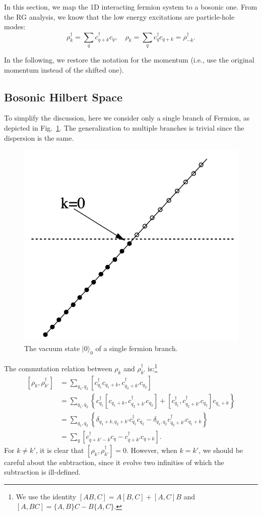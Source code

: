 In this section, we map the 1D interacting fermion system to a bosonic one.
From the RG analysis, we know that the low energy excitations are particle-hole modes:
\begin{equation}
	\rho_{k}^\dagger = \sum_{q} c_{q+k}^\dagger c_{q}, \quad
	\rho_{k} = \sum_{q} c_{q}^\dagger c_{q+k} = \rho_{-k}^\dagger.
\end{equation}

In the following, we restore the notation for the momentum (i.e., use the original momentum instead of the shifted one).
 

\subsection{Bosonic Hilbert Space}
To simplify the discussion, here we consider only a single branch of Fermion, as depicted in Fig.~\ref{fig:bs-hilbert}. The generalization to multiple branches is trivial since the dispersion is the same.

\begin{figure}
	\centering
	\includegraphics[width=0.25\linewidth]{pics/FL-hilbert.png}
	\caption{The vacuum state $|0\rangle_0$ of a single fermion branch.}
	\label{fig:bs-hilbert}
\end{figure}

The commutation relation between $\rho_k$ and $\rho_{k'}^\dagger$ is:\footnote{We use the identity $[AB,C] = A[B,C] + [A,C]B$ and $[A,BC]=\{A,B\}C - B\{A,C\}$.}
\begin{equation}
\begin{aligned}
	\left[\rho_{k}, \rho_{k'}^\dagger \right]
	&= \sum_{q_1, q_2} \left[c_{q_1}^\dagger c_{q_1+k}, c_{q_2+k'}^\dagger c_{q_2}\right] \\
	&= \sum_{q_1, q_2} \left\{c_{q_1}^\dagger \left[c_{q_1+k}, c_{q_2+k'}^\dagger c_{q_2}\right] +\left[c_{q_1}^\dagger, c_{q_2+k'}^\dagger c_{q_2}\right] c_{q_1+k}\right\} \\
	&= \sum_{q_1, q_2} \left\{ \delta_{q_1+k,q_2+k'} c_{q_1}^\dagger c_{q_2} -
		\delta_{q_1,q_2} c_{q_2+k'}^\dagger c_{q_1+k} \right\} \\
	&= \sum_{q}\left[c^\dagger_{q+k'-k} c_{q}-c^\dagger_{q+k'} c_{q+k}\right].
\end{aligned}
\end{equation}
For $k \ne k'$, it is clear that $[\rho_{k},\rho_{k'}^\dagger]=0$.
However, when $k = k'$, we should be careful about the subtraction, since it evolve two infinities of which the subtraction is ill-defined.

